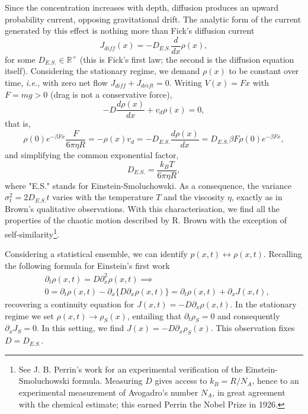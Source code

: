 Since the concentration increases with depth, diffusion produces an upward probability current, opposing gravitational drift.
The analytic form of the current generated by this effect is nothing more than Fick's diffusion current
\begin{equation}
J_{diff}(x)=-D_{E.S.}\frac{d}{dx}\rho(x),
\end{equation}
for some $D_{E.S.}\in \mathbb{R}^+$ (this is Fick's first law; the second is the diffusion equation itself).
Considering the stationary regime, we demand $\rho(x)$ to be constant over time, \textit{i.e.}, with zero net flow $J_{diff}+J_{drift}=0$.
Writing $V(x)=Fx$ with $F=mg>0$ (drag is not a conservative force),
\begin{equation}
-D\frac{d\rho(x)}{dx}+v_d\rho(x)=0,
\end{equation}
that is,
\begin{equation}
\rho(0)e^{-\beta Fx}\frac{F}{6\pi \eta R}=-\rho(x)v_d=-D_{E.S.}\frac{d\rho(x)}{dx}=D_{E.S.}\beta F\rho(0)e^{-\beta F x},
\end{equation}
and simplifying the common exponential factor,
\begin{equation}
D_{E.S.} =\frac{k_BT}{6\pi\eta R},
\end{equation}
where "E.S." stands for Einstein-Smoluchowski.
As a consequence, the variance $\sigma_t^2=2D_{E.S.}t$ varies with the temperature $T$ and the viscosity $\eta$, exactly as in Brown's qualitative observations.
With this characterisation, we find all the properties of the chaotic motion described by R. Brown with the exception of self-similarity\footnote{See J. B. Perrin's work for an experimental verification of the Einstein-Smoluchowski formula\cite{Perrin1909}.
Measuring $D$ gives access to $k_B=R/N_A$, hence to an experimental measurement of Avogadro's number $N_A$, in great agreement with the chemical estimate; this earned Perrin the Nobel Prize in 1926.
}.

Considering a statistical ensemble, we can identify $p(x,t)\leftrightarrow \rho(x,t)$.
Recalling the following formula for Einstein's first work
\begin{equation}\begin{split}
	& \partial_t\rho(x,t)=D\partial_x^2\rho(x,t)\implies\\
	& 0=\partial_t\rho(x,t)-\partial_x\{D\partial_x\rho(x,t)\}=\partial_t\rho(x,t)+\partial_x J(x,t),
\end{split}\end{equation}
recovering a continuity equation for $J(x,t)=-D\partial_x\rho(x,t)$.
In the stationary regime we set $\rho(x,t)\to \rho_S(x)$, entailing that $\partial_t\rho_S=0$ and consequently $\partial_xJ_S=0$.
In this setting, we find $J(x)=-D\partial_x\rho_S(x)$.
This observation fixes $D=D_{E.S.}$.


